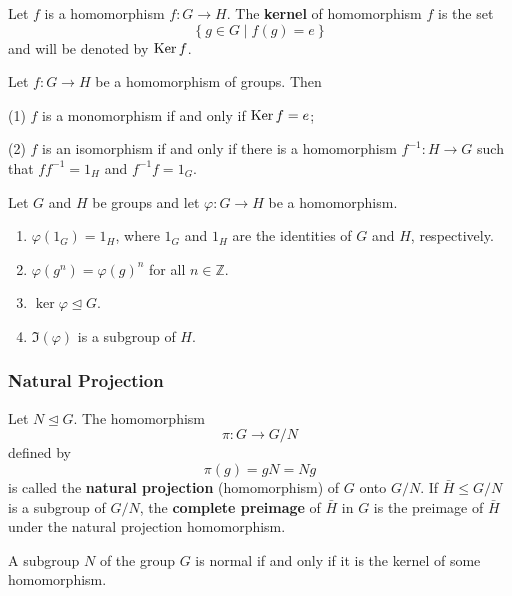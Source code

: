 \begin{definition}
    Let $f$ is a homomorphism $f: G \rightarrow H$.
    The \textbf{kernel} of homomorphism $f$ is the set
    \begin{equation*}
        \left\{ g \in G \mid f(g)= e \right\}
    \end{equation*}
    and will be denoted by $\operatorname{\operatorname{Ker}} f$.
\end{definition}
\begin{theorem}
    Let $f: G \rightarrow H$ be a homomorphism of groups. Then

    (1)
    $f$ is a monomorphism if and only if $\operatorname{\operatorname{Ker}} f=e$;

    (2) $f$ is an isomorphism if and only if there is a homomorphism $f^{-1}: H \rightarrow G$ such that $ff^{-1}=1_{H}$ and $f^{-1} f=1_{G}$.
\end{theorem}

\begin{proposition}
    Let $G$ and $H$ be groups and let $\varphi: G \rightarrow H$ be a homomorphism.
    \begin{enumerate}
        \item
              $\varphi\left(1_G\right)=1_H$, where $1_G$ and $1_H$ are the identities of $G$ and $H$, respectively.

        \item
              $\varphi\left(g^n\right)=\varphi(g)^n$ for all $n \in \mathbb{Z}$.

        \item
              $\ker\varphi \unlhd G$.

        \item
              $\Im (\varphi)$ is a subgroup of $H$.
    \end{enumerate}
\end{proposition}

\subsubsection{Natural Projection}
\begin{definition}
    Let $N \unlhd G$. The homomorphism
    \[
        \pi: G \rightarrow G / N
    \] defined by
    \[
        \pi(g)
        =
        g N
        =
        Ng
    \]
    is called the \textbf{natural projection} (homomorphism) of $G$ onto $G / N$. If $\bar{H} \leq G / N$ is a subgroup of $G / N$, the \textbf{complete preimage} of $\bar{H}$ in $G$ is the preimage of $\bar{H}$ under the natural projection homomorphism.
\end{definition}
\begin{theorem}
    A subgroup $N$ of the group $G$ is normal if and only if it is the kernel of some homomorphism.
\end{theorem}


